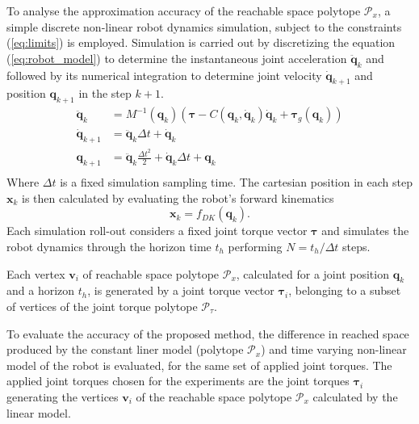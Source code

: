To analyse the approximation accuracy of the  reachable space polytope $\mathcal{P}_x$, a simple discrete non-linear robot dynamics simulation, subject to the constraints (\ref{eq:limits}) is employed. Simulation is carried out by discretizing the equation (\ref{eq:robot_model}) to determine the instantaneous joint acceleration $\ddot{\bm{q}}_{k}$ and followed by its numerical integration to determine joint velocity $\dot{\bm{q}}_{k+1}$ and position $\bm{q}_{k+1}$ in the step $k\!+\!1$. 
\begin{equation}
\begin{split}
    \ddot{\bm{q}}_{k} &= M^{-1}(\bm{q}_k)\left(\bm{\tau} - C(\bm{q}_k,\dot{\bm{q}}_k)\dot{\bm{q}}_k + \bm{\tau}_g(\bm{q}_k)\right)\\
    \dot{\bm{q}}_{k+1} &= \ddot{\bm{q}}_k\Delta t + \dot{\bm{q}}_{k}\\
    \bm{q}_{k+1} &= \ddot{\bm{q}}_k\frac{\Delta t^2}{2} + \dot{\bm{q}}_k\Delta t  + \bm{q}_{k}\\
\end{split}
\label{eq:simulation_imp}
\end{equation}
Where $\Delta t$ is a fixed simulation sampling time. The cartesian position in each step $\bm{x}_{k}$ is then calculated by evaluating the  robot's forward kinematics
\begin{equation}
    \bm{x}_{k} = f_{DK}(\bm{q}_{k}).
\end{equation}
Each simulation roll-out considers a fixed joint torque vector $\bm{\tau}$ and simulates the robot dynamics through the horizon time $t_h$ performing $N= t_h/\Delta t$ steps.

Each vertex $\bm{v}_i$ of reachable space polytope $\mathcal{P}_x$, calculated for a joint position  $\bm{q}_k$ and a horizon $t_h$, is generated by a joint torque vector $\bm{\tau}_i$, belonging to a subset of vertices of the joint torque polytope $\mathcal{P}_\tau$.


To evaluate the accuracy of the proposed method, the difference in reached space produced by the constant liner model (polytope $\mathcal{P}_x$) and time varying non-linear model of the robot is evaluated, for the same set of applied joint torques. The applied joint torques chosen for the experiments are the joint torques $\bm{\tau}_i$ generating the vertices $\bm{v}_i$ of the reachable space polytope $\mathcal{P}_x$ calculated by the linear model.


